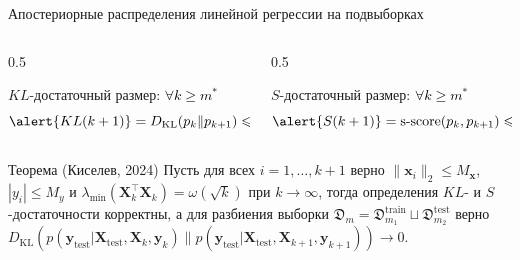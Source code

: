 \documentclass[aspectratio=169]{beamer}
\begin{document}
\begin{frame}{Апостериорные распределения линейной регрессии на подвыборках}
\begin{equation*}
\end{equation*}
\vspace{-1.4em}
\begin{columns}[T]
    \begin{column}{0.5\textwidth}
        \hspace*{0.2em}
        \begin{minipage}{\linewidth}
        \begin{block}{$KL$-достаточный размер: \textcolor{black}{$\forall k \geqslant m^*$}}
            \vspace{-1.0em}
            \begin{equation*}
                \alert{KL(k+1)} = D_{\mathrm{KL}}(p_{k} \| p_{k+1}) \leqslant \varepsilon
            \end{equation*}
        \end{block}
        \end{minipage}
    \end{column}
    \begin{column}{0.5\textwidth}
        \begin{block}{$S$-достаточный размер: \textcolor{black}{$\forall k \geqslant m^*$}}
            \vspace{-1.0em}
            \begin{equation*}
                \alert{S(k+1)} = \text{s-score}(p_{k}, p_{k+1})\leqslant \varepsilon
            \end{equation*}
        \end{block}
    \end{column}
\end{columns}
\begin{block}{Теорема (Киселев, 2024)}
    Пусть для всех $i = 1, \ldots, k+1$ верно $\| \mathbf{x}_i \|_2 \leqslant M_{\mathbf{x}}$, $| y_i | \leqslant M_y$ и $\lambda_{\min}(\mathbf{X}_{k}^\top \mathbf{X}_{k}) = \omega(\sqrt{k})$ при $k \to \infty$, тогда определения $KL$- и $S$-достаточности корректны, а для разбиения выборки $\mathfrak{D}_{m} = \mathfrak{D}_{m_1}^{\mathrm{train}} \sqcup \mathfrak{D}_{m_2}^{\mathrm{test}}$ верно $D_{\mathrm{KL}}( p(\mathbf{y}_{\mathrm{test}} | \mathbf{X}_{\mathrm{test}}, \mathbf{X}_{k}, \mathbf{y}_{k}) \| p(\mathbf{y}_{\mathrm{test}} | \mathbf{X}_{\mathrm{test}}, \mathbf{X}_{k+1}, \mathbf{y}_{k+1}) ) \to 0$.
\end{block}
\end{frame}
\end{document}
